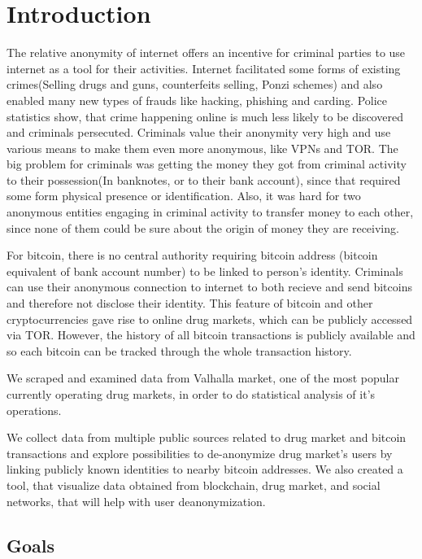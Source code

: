 \documentclass[
  digital, %
  table,   %
  lof,     %
  lot,     %
  oneside
]{fithesis3}
\begin{document}
\chapter{Introduction}

The relative anonymity of internet offers an incentive for criminal parties to use internet as a tool for their activities.
Internet facilitated some forms of existing crimes(Selling drugs and guns,
counterfeits selling, Ponzi schemes) and also enabled many new types of frauds like hacking, phishing and carding.
Police statistics show, that crime happening online is much less likely to be discovered and criminals persecuted.
Criminals value their anonymity very high and use various means to make them even more anonymous,
like VPNs and TOR.
The big problem for criminals was getting the money they got from criminal activity to their possession(In banknotes,
or to their bank account), since that required some form physical presence or identification.
Also, it was hard for two anonymous entities engaging in criminal activity to transfer money to each other,
since none of them could be sure about the origin of money they are receiving.

For bitcoin, there is no central authority requiring bitcoin address
(bitcoin equivalent of bank account number) to be linked to person's identity.
Criminals can use their anonymous connection to internet to both recieve and send bitcoins and therefore not disclose their identity.
This feature of bitcoin and other cryptocurrencies gave rise to online drug markets, which can be publicly accessed via TOR. However,
the history of all bitcoin transactions is publicly available and so each bitcoin can be tracked through the whole transaction history.

We scraped and examined data from Valhalla market, one of the most popular currently operating drug markets,
in order to do statistical analysis of it's operations.

We collect data from multiple public sources related to drug market and bitcoin transactions and explore
 possibilities to de-anonymize drug market's users by linking publicly known identities to nearby bitcoin addresses.
We also created a tool, that visualize data obtained from blockchain, drug market, and social networks,
 that will help with user deanonymization.

\section{Goals}
\end{document}
